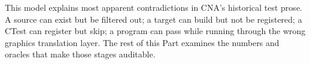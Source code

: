 This model explains most apparent contradictions in CNA's historical test prose.  A source can
exist but be filtered out; a target can build but not be registered; a CTest can register but
skip; a program can pass while running through the wrong graphics translation layer.  The rest
of this Part examines the numbers and oracles that make those stages auditable.
